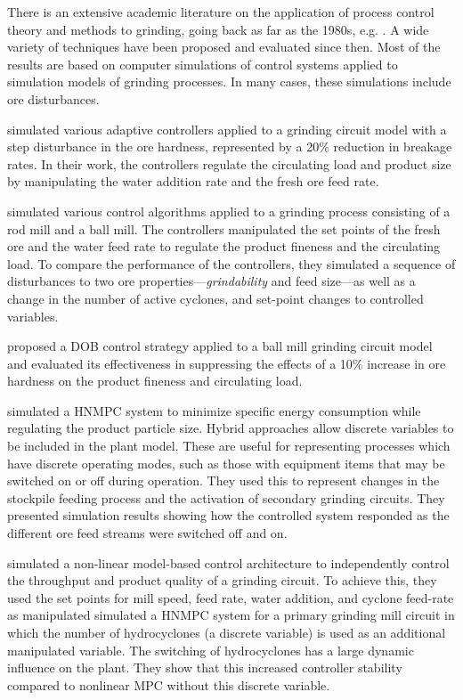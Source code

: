 There is an extensive academic literature on the application of process control theory and methods to grinding, going back as far as the 1980s, e.g. \cite{herbst_optimal_1988}. A wide variety of techniques have been proposed and evaluated since then. Most of the results are based on computer simulations of control systems applied to simulation models of grinding processes. In many cases, these simulations include ore disturbances.

\cite{najim_adaptive_1995} simulated various adaptive controllers applied to a grinding circuit model with a step disturbance in the ore hardness, represented by a 20\% reduction in breakage rates. In their work, the controllers regulate the circulating load and product size by manipulating the water addition rate and the fresh ore feed rate.

\cite{pomerleau_survey_2000} simulated various control algorithms applied to a grinding process consisting of a rod mill and a ball mill. The controllers manipulated the set points of the fresh ore and the water feed rate to regulate the product fineness and the circulating load. To compare the performance of the controllers, they simulated a sequence of disturbances to two ore properties---\textit{grindability} and feed size---as well as a change in the number of active cyclones, and set-point changes to controlled variables.

\cite{chen_disturbance_2009} proposed a \gls{DOB} control strategy applied to a ball mill grinding circuit model and evaluated its effectiveness in suppressing the effects of a 10\% increase in ore hardness on the product fineness and circulating load.

\cite{estrada_hybrid_2014} simulated a \gls{HNMPC} system to minimize specific energy consumption while regulating the product particle size. Hybrid approaches allow discrete variables to be included in the plant model. These are useful for representing processes which have discrete operating modes, such as those with equipment items that may be switched on or off during operation. They used this to represent changes in the stockpile feeding process and the activation of secondary grinding circuits. They presented simulation results showing how the controlled system responded as the different ore feed streams were switched off and on.

\cite{le_roux_throughput_2016} simulated a non-linear model-based control architecture to independently control the throughput and product quality of a grinding circuit. To achieve this, they used the set points for mill speed, feed rate, water addition, and cyclone feed-rate as manipulated \cite{botha_hybrid_2018} simulated a \gls{HNMPC} system for a primary grinding mill circuit in which the number of hydrocyclones (a discrete variable) is used as an additional manipulated variable. The switching of hydrocyclones has a large dynamic influence on the plant. They show that this increased controller stability compared to nonlinear \gls{MPC} without this discrete variable.

